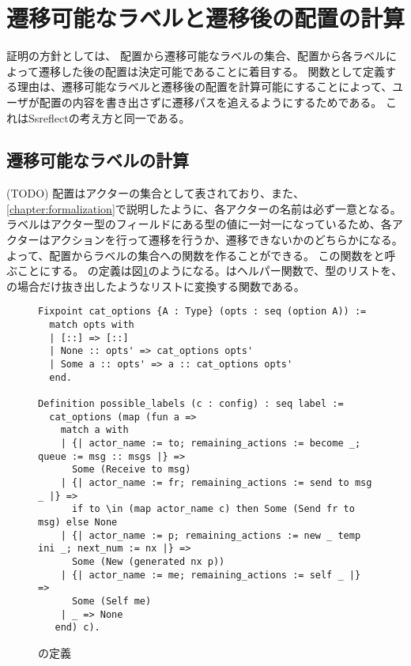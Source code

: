\section{遷移可能なラベルと遷移後の配置の計算}

証明の方針としては、
配置から遷移可能なラベルの集合、配置から各ラベルによって遷移した後の配置は決定可能であることに着目する。
関数として定義する理由は、遷移可能なラベルと遷移後の配置を計算可能にすることによって、ユーザが配置の内容を書き出さずに遷移パスを追えるようにするためである。
これはSsreflectの考え方と同一である。

\subsection{遷移可能なラベルの計算}

(TODO)
配置はアクターの集合として表されており、また、\ref{chapter:formalization}で説明したように、各アクターの名前は必ず一意となる。
ラベルはアクター型のフィールドにある型の値に一対一になっているため、各アクターはアクションを行って遷移を行うか、遷移できないかのどちらかになる。
よって、配置からラベルの集合への関数を作ることができる。
この関数をと呼ぶことにする。
の定義は図\ref{code:proof:possible-labels}のようになる。はヘルパー関数で、型のリストを、の場合だけ抜き出したようなリストに変換する関数である。

\begin{figure}
\begin{lstlisting}
Fixpoint cat_options {A : Type} (opts : seq (option A)) :=
  match opts with
  | [::] => [::]
  | None :: opts' => cat_options opts'
  | Some a :: opts' => a :: cat_options opts'
  end.

Definition possible_labels (c : config) : seq label :=
  cat_options (map (fun a =>
    match a with
    | {| actor_name := to; remaining_actions := become _; queue := msg :: msgs |} =>
      Some (Receive to msg)
    | {| actor_name := fr; remaining_actions := send to msg _ |} =>
      if to \in (map actor_name c) then Some (Send fr to msg) else None
    | {| actor_name := p; remaining_actions := new _ temp ini _; next_num := nx |} =>
      Some (New (generated nx p))
    | {| actor_name := me; remaining_actions := self _ |} =>
      Some (Self me)
    | _ => None
   end) c).
\end{lstlisting}
\label{code:proof:possible-labels}
\caption{の定義}
\end{figure}

